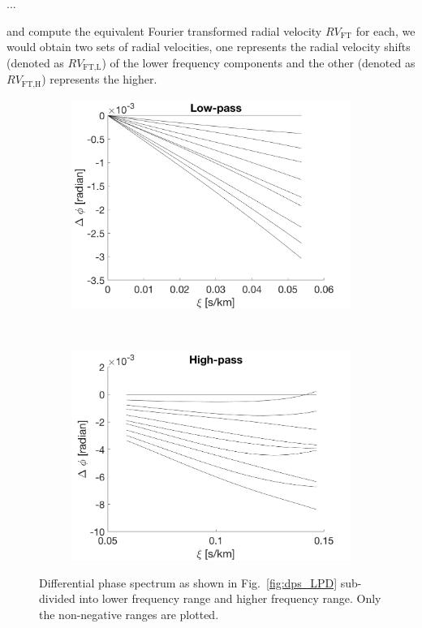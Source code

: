 ...

and compute the equivalent Fourier transformed radial velocity $RV_\text{FT}$ for each, we would obtain two sets of radial velocities, one represents the radial velocity shifts (denoted as $RV_\text{FT,L}$) of the lower frequency components and the other (denoted as $RV_\text{FT,H}$) represents the higher. 

\begin{figure}[tbp]	
    \begin{subfigure}[b]{0.49\textwidth}
        \includegraphics[width=\textwidth]{./Figures/Methods/4-Relative_phase_angle_L.png}
    \end{subfigure}
	~
    \begin{subfigure}[b]{0.49\textwidth}
        \includegraphics[width=\textwidth]{./Figures/Methods/4-Relative_phase_angle_H.png}
    \end{subfigure}	
    
    \caption[Low-pass and high-pass filters]
    {Differential phase spectrum as shown in Fig.~\ref{fig:dps_LPD} sub-divided into lower frequency range and higher frequency range. Only the non-negative ranges are plotted.}
\label{fig:low-high-pass_lpd}
\end{figure}    

